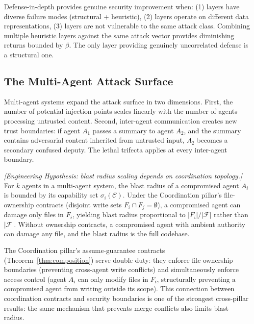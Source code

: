 \begin{proposition}
\label{prop:genuine-did-sec}
Defense-in-depth provides genuine security improvement when: (1) layers have diverse failure modes (structural + heuristic), (2) layers operate on different data representations, (3) layers are not vulnerable to the same attack class. Combining multiple heuristic layers against the same attack vector provides diminishing returns bounded by $\beta$. The only layer providing genuinely uncorrelated defense is a structural one.
\end{proposition}

\subsection{The Multi-Agent Attack Surface}

Multi-agent systems expand the attack surface in two dimensions. First, the number of potential injection points scales linearly with the number of agents processing untrusted content. Second, inter-agent communication creates new trust boundaries: if agent $A_1$ passes a summary to agent $A_2$, and the summary contains adversarial content inherited from untrusted input, $A_2$ becomes a secondary confused deputy. The lethal trifecta \citep{willison2024trifecta} applies at every inter-agent boundary.

\begin{proposition}
\emph{[Engineering Hypothesis: blast radius scaling depends on coordination topology.]}
\label{prop:multi-agent-blast}
For $k$ agents in a multi-agent system, the blast radius of a compromised agent $A_i$ is bounded by its capability set $\sigma_i(\mathcal{C})$. Under the Coordination pillar's file-ownership contracts (disjoint write sets $F_i \cap F_j = \emptyset$), a compromised agent can damage only files in $F_i$, yielding blast radius proportional to $|F_i| / |\mathcal{F}|$ rather than $|\mathcal{F}|$. Without ownership contracts, a compromised agent with ambient authority can damage any file, and the blast radius is the full codebase.
\end{proposition}

The Coordination pillar's assume-guarantee contracts (Theorem~\ref{thm:composition}) serve double duty: they enforce file-ownership boundaries (preventing cross-agent write conflicts) and simultaneously enforce access control (agent $A_i$ can only modify files in $F_i$, structurally preventing a compromised agent from writing outside its scope). This connection between coordination contracts and security boundaries is one of the strongest cross-pillar results: the same mechanism that prevents merge conflicts also limits blast radius.


